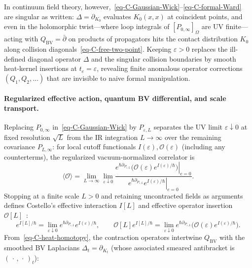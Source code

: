 \documentclass[11pt]{article}
\numberwithin{equation}{section}
\numberwithin{figure}{section}
\numberwithin{table}{section}
\begin{document}
In continuum field theory, however,~\eqref{eq-C-Gaussian-Wick}--\eqref{eq-C-formal-Ward} are singular as written: $\Delta=\partial_{K_0}$ evaluates $K_0(x,x)$ at coincident points, and even in the holomorphic twist---where loop integrals of $[P_{0,\infty}]_\Omega$ are UV finite---acting with $Q_{\mathrm{BV}}=\bar\partial$ on products of propagators hits the contact distribution $K_0$ along collision diagonals~\eqref{eq-C-free-two-point}. Keeping $\varepsilon>0$ replaces the ill-defined diagonal operator $\Delta$ and the singular collision boundaries by smooth heat-kernel insertions at $t_e=\varepsilon$, revealing finite anomalous operator corrections $(Q_1,Q_2,\ldots)$ that are invisible to naive formal manipulation.

\paragraph{Regularized effective action, quantum BV differential, and scale transport.}
Replacing $P_{0,\infty}$ in~\eqref{eq-C-Gaussian-Wick} by $P_{\varepsilon,L}$ separates the UV limit $\varepsilon\downarrow0$ at fixed resolution $\sqrt L$ from the IR integration $L\to\infty$ over the remaining covariance $P_{L,\infty}$: for local cutoff functionals $I(\varepsilon),\mathcal O(\varepsilon)$ (including any counterterms), the regularized vacuum-normalized correlator is
\begin{equation}\label{eq-C-cutoff-correlator}
\langle\mathcal O\rangle
=\lim_{L\to\infty}\lim_{\varepsilon\downarrow0}
\frac{\left.e^{\hbar\partial_{P_{\varepsilon,L}}}
 \bigl(\mathcal O(\varepsilon)e^{I(\varepsilon)/\hbar}\bigr)\right|_{e=0}}
 {\left.e^{\hbar\partial_{P_{\varepsilon,L}}}
 e^{I(\varepsilon)/\hbar}\right|_{e=0}}.
\end{equation}
Stopping at a finite scale $L>0$ and retaining uncontracted fields as arguments defines Costello's effective interaction $I[L]$ and effective operator insertion $\mathcal O[L]$~\cite{CostelloBV}:
\begin{equation}\label{eq-C-local-to-effective}
e^{I[L]/\hbar}
=\lim_{\varepsilon\downarrow0}
 e^{\hbar\partial_{P_{\varepsilon,L}}}e^{I(\varepsilon)/\hbar},\qquad
\mathcal O[L]e^{I[L]/\hbar}
=\lim_{\varepsilon\downarrow0}
 e^{\hbar\partial_{P_{\varepsilon,L}}}
 \bigl(\mathcal O(\varepsilon)e^{I(\varepsilon)/\hbar}\bigr).
\end{equation}
From~\eqref{eq-C-heat-homotopy}, the contraction operators intertwine $Q_{\mathrm{BV}}$ with the smoothed BV Laplacians $\Delta_t=\partial_{K_t}$ (whose associated smeared antibracket is $(\,\cdot\,,\,\cdot\,)_t$):
\end{document}
